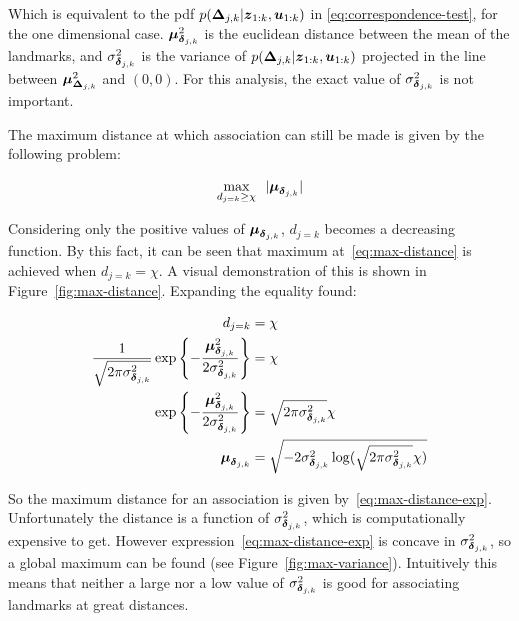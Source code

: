 Which is equivalent to the pdf $p(\boldsymbol{\Delta}_{j,k}|\boldsymbol{z}_{1:k},\boldsymbol{u}_{1:k})$ in \eqref{eq:correspondence-test}, for the one dimensional case. $\boldsymbol{\mu}_{\boldsymbol{\delta}_{j,k}}^2$ is the euclidean distance between the mean of the landmarks, and $\sigma_{\boldsymbol{\delta}_{j,k}}^2$ is the variance of $p(\boldsymbol{\Delta}_{j,k}|\boldsymbol{z}_{1:k},\boldsymbol{u}_{1:k})$ projected in the line between $\boldsymbol{\mu}_{\boldsymbol{\Delta}_{j,k}}^2$ and $(0,0)$. For this analysis, the exact value of $\sigma_{\boldsymbol{\delta}_{j,k}}^2$ is not important.

The maximum distance at which association can still be made is given by the following problem:

\begin{equation}
\underset{d_{j=k}\geq\chi}{\text{max}}~~  |\boldsymbol{\mu}_{\boldsymbol{\delta}_{j,k}}|
\label{eq:max-distance}
\end{equation}

Considering only the positive values of $\boldsymbol{\mu}_{\boldsymbol{\delta}_{j,k}}$, $d_{j=k}$ becomes a decreasing function. By this fact, it can be seen that maximum at~\eqref{eq:max-distance} is achieved when $d_{j=k}=\chi$. A visual demonstration of this is shown in Figure~\ref{fig:max-distance}. Expanding the equality found:

\begin{align}
d_{j=k} &= \chi\\
\frac{1}{\sqrt{2\pi\sigma_{\boldsymbol{\delta}_{j,k}}^2}}
\exp\left\lbrace -\frac{\boldsymbol{\mu}_{\boldsymbol{\delta}_{j,k}}^2}{2\sigma_{\boldsymbol{\delta}_{j,k}}^2}\right\rbrace &= \chi \\
\exp\left\lbrace -\frac{\boldsymbol{\mu}_{\boldsymbol{\delta}_{j,k}}^2}{2\sigma_{\boldsymbol{\delta}_{j,k}}^2}\right\rbrace&= \sqrt{2\pi\sigma_{\boldsymbol{\delta}_{j,k}}^2} \chi\\
\boldsymbol{\mu}_{\boldsymbol{\delta}_{j,k}} &= \sqrt{-2\sigma_{\boldsymbol{\delta}_{j,k}}^2\log(\sqrt{2\pi\sigma_{\boldsymbol{\delta}_{j,k}}^2} \chi)} \label{eq:max-distance-exp}
\end{align}

So the maximum distance for an association is given by~\eqref{eq:max-distance-exp}. Unfortunately the distance is a function of $\sigma_{\boldsymbol{\delta}_{j,k}}^2$, which is computationally expensive to get. However expression~\eqref{eq:max-distance-exp} is concave in $\sigma_{\boldsymbol{\delta}_{j,k}}^2$, so a global maximum can be found (see Figure~\ref{fig:max-variance}). Intuitively this means that neither a large nor a low value of $\sigma_{\boldsymbol{\delta}_{j,k}}^2$ is good for associating landmarks at great distances. 

